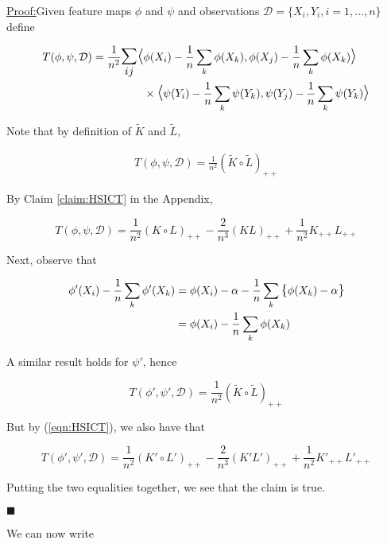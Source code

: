 \documentclass[12pt]{article}
\newenvironment{claimproof}[1]{\par\noindent\underline{Proof:}\space#1}{\hfill $\blacksquare$}
\numberwithin{claim}{section}
\numberwithin{lemma}{section}
\numberwithin{theorem}{section}
\begin{document}
\begin{claimproof}
Given feature maps $\phi$ and $\psi$ and observations $\mathcal{D} = \{X_i, Y_i, i=1,\ldots,n\}$ define 

\begin{align*}
T(\phi, \psi, \mathcal{D}) = \frac{1}{n^2} \mathlarger{\mathlarger{\sum_{ij}}} \mathlarger{\mathlarger{\langle}} & \phi(X_i) - \frac{1}{n}\sum_k \phi(X_k), \phi(X_j) - \frac{1}{n}\sum_k \phi(X_k) \mathlarger{\mathlarger{\rangle}} \\ &\times \mathlarger{\mathlarger{\langle}} \psi(Y_i) - \frac{1}{n}\sum_k \psi(Y_k), \psi(Y_j) - \frac{1}{n}\sum_k \psi(Y_k) \mathlarger{\mathlarger{\rangle}}
\end{align*}

Note that by definition of $\tilde{K}$ and $\tilde{L}$,

\begin{align*}
T(\phi, \psi, \mathcal{D}) = \frac{1}{n^2} (\tilde{K}\circ \tilde{L})_{++}
\end{align*}

By Claim \ref{claim:HSICT} in the Appendix,

\begin{equation}\label{eqn:HSICT}
T(\phi, \psi, \mathcal{D})= \frac{1}{n^2} (K\circ L)_{++} - \frac{2}{n^3} (KL)_{++} + \frac{1}{n^2} K_{++}L_{++} \tag{$*$}
\end{equation}

Next, observe that

\begin{align*}
\phi'(X_i) - \frac{1}{n} \sum_k \phi'(X_k) &= \phi(X_i) - \alpha - \frac{1}{n} \sum_k \mathlarger{\{} \phi(X_k) - \alpha\mathlarger{\}} \\
& = \phi(X_i) - \frac{1}{n} \sum_k \phi(X_k)
\end{align*}

A similar result holds for $\psi'$, hence

\[T(\phi',\psi', \mathcal{D}) = \frac{1}{n^2} (\tilde{K}\circ \tilde{L})_{++}\]

But by (\ref{eqn:HSICT}), we also have that

\[T(\phi',\psi', \mathcal{D}) = \frac{1}{n^2} (K'\circ L')_{++} - \frac{2}{n^3} (K'L')_{++} + \frac{1}{n^2} K'_{++}L'_{++} \]

Putting the two equalities together, we see that the claim is true.

\end{claimproof}

We can now write
\end{document}
